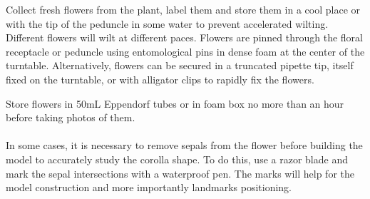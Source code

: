 \documentclass[10pt,letter,english]{article}
\begin{document}
Collect fresh flowers from the plant, label them and store them in a cool place or with the tip of the peduncle in some water to prevent accelerated wilting. Different flowers will wilt at different paces.
Flowers are pinned through the floral receptacle or peduncle using entomological pins in dense foam at the center of the turntable. Alternatively, flowers can be secured in a truncated pipette tip, itself fixed on the turntable, or with alligator clips to rapidly fix the flowers.

\begin{tcolorbox}[width=\linewidth, colback=mygray,title=Suggestion for the Joly Lab,colframe=lightgray] %
Store flowers in 50mL Eppendorf tubes or in foam box no more than an hour before taking photos of them.\\
\\
In some cases, it is necessary to remove sepals from the flower before building the model to accurately study the corolla shape. To do this, use a razor blade and mark the sepal intersections with a waterproof pen. The marks will help for the model construction and more importantly landmarks positioning.
\end{tcolorbox}
\end{document}
